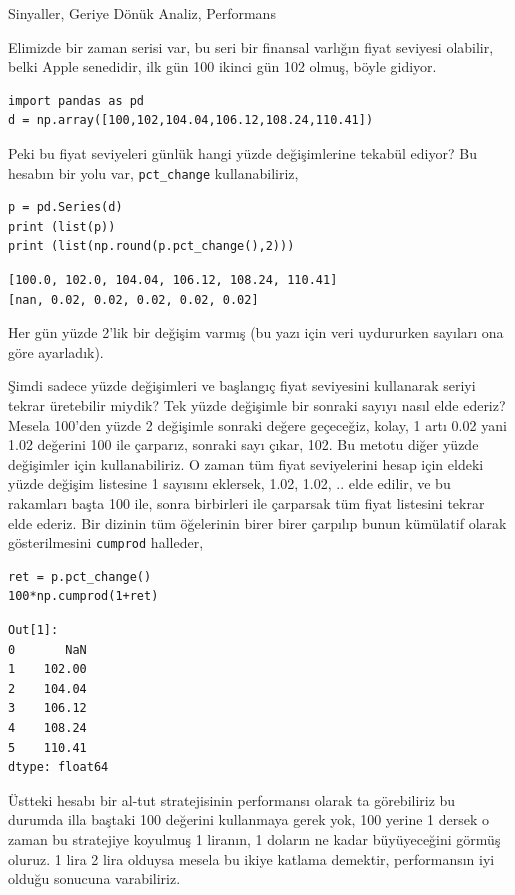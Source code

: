 \documentclass[12pt,fleqn]{article}\usepackage{../../common}
\begin{document}
Sinyaller, Geriye Dönük Analiz, Performans

Elimizde bir zaman serisi var, bu seri bir finansal varlığın fiyat seviyesi
olabilir, belki Apple senedidir, ilk gün 100 ikinci gün 102 olmuş, böyle
gidiyor.

\begin{verbatim}
import pandas as pd
d = np.array([100,102,104.04,106.12,108.24,110.41])
\end{verbatim}

Peki bu fiyat seviyeleri günlük hangi yüzde değişimlerine tekabül ediyor?
Bu hesabın bir yolu var, \verb!pct_change! kullanabiliriz,

\begin{verbatim}
p = pd.Series(d)
print (list(p))
print (list(np.round(p.pct_change(),2)))
\end{verbatim}

\begin{verbatim}
[100.0, 102.0, 104.04, 106.12, 108.24, 110.41]
[nan, 0.02, 0.02, 0.02, 0.02, 0.02]
\end{verbatim}

Her gün yüzde 2'lik bir değişim varmış (bu yazı için veri uydururken sayıları
ona göre ayarladık).

Şimdi sadece yüzde değişimleri ve başlangıç fiyat seviyesini kullanarak seriyi
tekrar üretebilir miydik? Tek yüzde değişimle bir sonraki sayıyı nasıl elde
ederiz?  Mesela 100'den yüzde 2 değişimle sonraki değere geçeceğiz, kolay, 1
artı 0.02 yani 1.02 değerini 100 ile çarparız, sonraki sayı çıkar, 102. Bu
metotu diğer yüzde değişimler için kullanabiliriz. O zaman tüm fiyat
seviyelerini hesap için eldeki yüzde değişim listesine 1 sayısını eklersek,
1.02, 1.02, .. elde edilir, ve bu rakamları başta 100 ile, sonra birbirleri ile
çarparsak tüm fiyat listesini tekrar elde ederiz. Bir dizinin tüm öğelerinin
birer birer çarpılıp bunun kümülatif olarak gösterilmesini \verb!cumprod!
halleder,

\begin{verbatim}
ret = p.pct_change()
100*np.cumprod(1+ret)
\end{verbatim}

\begin{verbatim}
Out[1]: 
0       NaN
1    102.00
2    104.04
3    106.12
4    108.24
5    110.41
dtype: float64
\end{verbatim}

Üstteki hesabı bir al-tut stratejisinin performansı olarak ta görebiliriz bu
durumda illa baştaki 100 değerini kullanmaya gerek yok, 100 yerine 1 dersek o
zaman bu stratejiye koyulmuş 1 liranın, 1 doların ne kadar büyüyeceğini görmüş
oluruz.  1 lira 2 lira olduysa mesela bu ikiye katlama demektir, performansın
iyi olduğu sonucuna varabiliriz.
\end{document}
